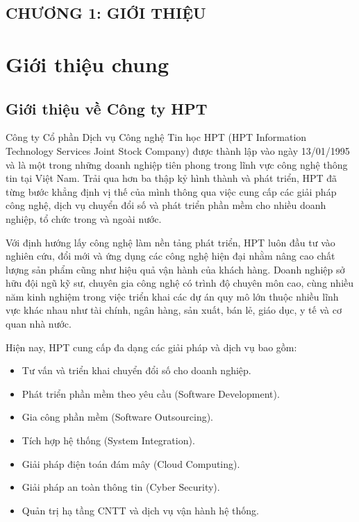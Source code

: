 
\begin{center}
	\section*{CHƯƠNG 1: GIỚI THIỆU}
\end{center}
\section{Giới thiệu chung}

\subsection{Giới thiệu về Công ty HPT}

Công ty Cổ phần Dịch vụ Công nghệ Tin học HPT (HPT Information Technology Services Joint Stock Company) được thành lập vào ngày 13/01/1995 và là một trong những doanh nghiệp tiên phong trong lĩnh vực công nghệ thông tin tại Việt Nam. Trải qua hơn ba thập kỷ hình thành và phát triển, HPT đã từng bước khẳng định vị thế của mình thông qua việc cung cấp các giải pháp công nghệ, dịch vụ chuyển đổi số và phát triển phần mềm cho nhiều doanh nghiệp, tổ chức trong và ngoài nước.

Với định hướng lấy công nghệ làm nền tảng phát triển, HPT luôn đầu tư vào nghiên cứu, đổi mới và ứng dụng các công nghệ hiện đại nhằm nâng cao chất lượng sản phẩm cũng như hiệu quả vận hành của khách hàng. Doanh nghiệp sở hữu đội ngũ kỹ sư, chuyên gia công nghệ có trình độ chuyên môn cao, cùng nhiều năm kinh nghiệm trong việc triển khai các dự án quy mô lớn thuộc nhiều lĩnh vực khác nhau như tài chính, ngân hàng, sản xuất, bán lẻ, giáo dục, y tế và cơ quan nhà nước.

Hiện nay, HPT cung cấp đa dạng các giải pháp và dịch vụ bao gồm:

\begin{itemize}
    \item Tư vấn và triển khai chuyển đổi số cho doanh nghiệp.
    \item Phát triển phần mềm theo yêu cầu (Software Development).
    \item Gia công phần mềm (Software Outsourcing).
    \item Tích hợp hệ thống (System Integration).
    \item Giải pháp điện toán đám mây (Cloud Computing).
    \item Giải pháp an toàn thông tin (Cyber Security).
    \item Quản trị hạ tầng CNTT và dịch vụ vận hành hệ thống.
\end{itemize}

